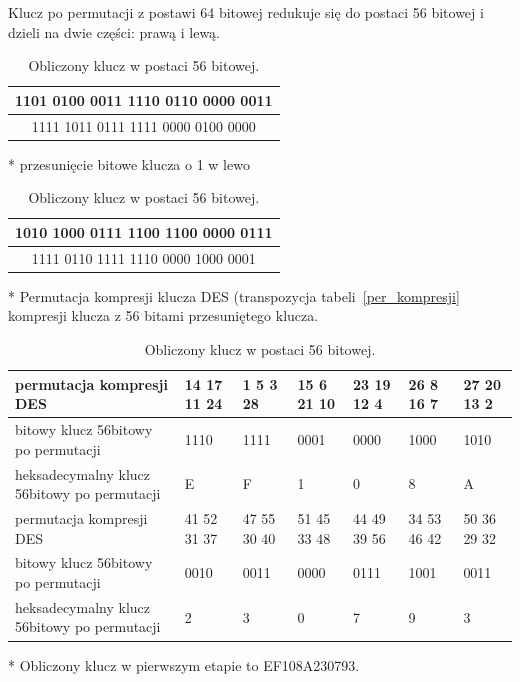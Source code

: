 \documentclass[12p]{article}
\begin{document}
Klucz po permutacji z postawi 64 bitowej redukuje się do postaci 56 bitowej i dzieli na dwie części: prawą i lewą. 

\begin{table}[!h]
\centering
\begin{tabular}{|c|}
\hline
1101 0100 0011 1110 0110 0000 0011\\
\hline
1111 1011 0111 1111 0000 0100 0000\\
\hline
\end{tabular}
\caption{Obliczony klucz w postaci 56 bitowej.}
\end{table}

* przesunięcie bitowe klucza o 1 w lewo
\begin{table}[!h]
\centering
\begin{tabular}{|c|}
\hline
1010 1000 0111 1100 1100 0000 0111\\
\hline
1111 0110 1111 1110 0000 1000 0001\\
\hline
\end{tabular}
\caption{Obliczony klucz w postaci 56 bitowej.}
\end{table}

* Permutacja kompresji klucza DES (transpozycja tabeli~\ref{per_kompresji} kompresji klucza z 56 bitami przesuniętego klucza.

\begin{table}[!h]
\centering
\begin{tabular}{ | p{3cm} | p{1.7cm} | p{1.7cm} | p{1.7cm} | p{1.7cm} | p{1.7cm} | p{1.7cm} |}
\hline
permutacja kompresji DES & 14 17 11 24  & 1 5 3 28 &  15 6 21 10 & 23  19 12 4 & 26 8 16 7 & 27 20 13 2\\ \hline
bitowy klucz 56bitowy po permutacji & 1110 & 1111 & 0001 & 0000 & 1000 & 1010 \\ \hline
heksadecymalny klucz 56bitowy po permutacji & E & F & 1 & 0 & 8 & A\\
\hline \hline
permutacja kompresji DES & 41 52 31 37 & 47 55 30 40 & 51 45 33 48 & 44 49 39 56 & 34 53 46 42 & 50 36 29 32\\ \hline
bitowy klucz 56bitowy po permutacji & 0010 & 0011 & 0000 & 0111 & 1001 & 0011\\ \hline
heksadecymalny klucz 56bitowy po permutacji & 2 & 3 & 0 & 7 & 9 & 3\\ 
\hline
\end{tabular}
\caption{Obliczony klucz w postaci 56 bitowej.}
\end{table}

* Obliczony klucz w pierwszym etapie to EF108A230793.
\end{document}
